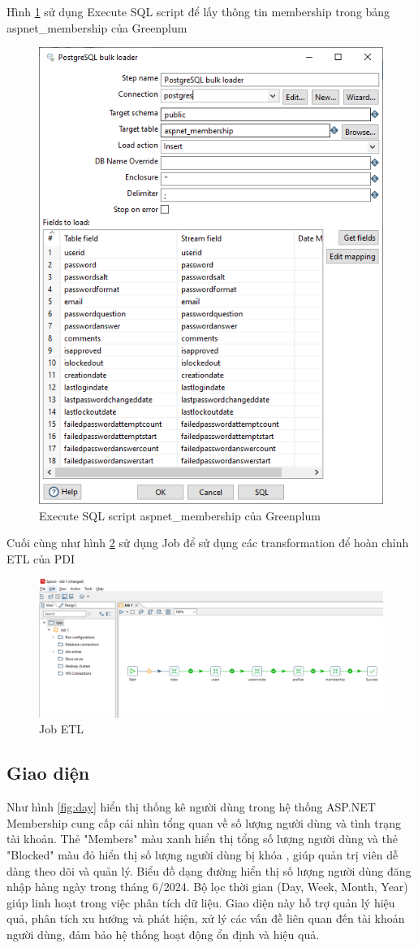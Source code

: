 \documentclass{article}[14pt]
\begin{document}
Hình \ref{fig:bulk_mem} sử dụng Execute SQL script để lấy thông tin membership trong bảng aspnet\_membership của Greenplum


\begin{figure}
    \centering
    \includegraphics[width=0.5\linewidth]{images/bulk_mem.png}
     \caption{Execute SQL script aspnet\_membership của Greenplum}
    \label{fig:bulk_mem}
\end{figure}






Cuối cùng như hình \ref{fig:job} sử dụng Job để sử dụng các transformation để hoàn chỉnh ETL của PDI


\begin{figure}
    \centering
    \includegraphics[width=0.5\linewidth]{images/job.png}
    \caption{Job ETL}
    \label{fig:job}
\end{figure}



\subsection{Giao diện}



Như hình \ref{fig:day} hiển thị thống kê người dùng trong hệ thống ASP.NET Membership cung cấp cái nhìn tổng quan về số lượng người dùng và tình trạng tài khoản. Thẻ "Members" màu xanh hiển thị tổng số lượng người dùng và thẻ "Blocked" màu đỏ hiển thị số lượng người dùng bị khóa , giúp quản trị viên dễ dàng theo dõi và quản lý. Biểu đồ dạng đường hiển thị số lượng người dùng đăng nhập hàng ngày trong tháng 6/2024. Bộ lọc thời gian (Day, Week, Month, Year) giúp linh hoạt trong việc phân tích dữ liệu. Giao diện này hỗ trợ quản lý hiệu quả, phân tích xu hướng và phát hiện, xử lý các vấn đề liên quan đến tài khoản người dùng, đảm bảo hệ thống hoạt động ổn định và hiệu quả.
\end{document}
